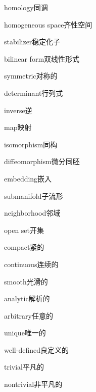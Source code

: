 \begin{multicols}{2}
homology\hspace{0.9em}同调\par
homogeneous space\hspace{0.9em}齐性空间\par
stabilizer\hspace{0.9em}稳定化子\par
bilinear form\hspace{0.9em}双线性形式\par
symmetric\hspace{0.9em}对称的\par
determinant\hspace{0.9em}行列式\par
inverse\hspace{0.9em}逆\par
map\hspace{0.9em}映射\par
isomorphism\hspace{0.9em}同构\par
diffeomorphism\hspace{0.9em}微分同胚\par
embedding\hspace{0.9em}嵌入\par
submanifold\hspace{0.9em}子流形\par
neighborhood\hspace{0.9em}邻域\par
open set\hspace{0.9em}开集\par
compact\hspace{0.9em}紧的\par
continuous\hspace{0.9em}连续的\par
smooth\hspace{0.9em}光滑的\par
analytic\hspace{0.9em}解析的\par
arbitrary\hspace{0.9em}任意的\par
unique\hspace{0.9em}唯一的\par
well-defined\hspace{0.9em}良定义的\par
trivial\hspace{0.9em}平凡的\par
nontrivial\hspace{0.9em}非平凡的\par

\end{multicols}
